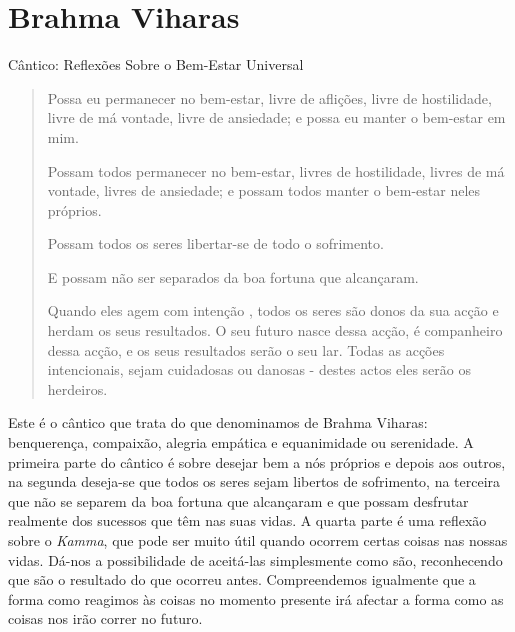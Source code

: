 \chapter{Brahma Viharas}

Cântico: Reflexões Sobre o Bem-Estar Universal

\begin{quote}
  Possa eu permanecer no bem-estar, livre de aflições, livre de hostilidade,
  livre de má vontade, livre de ansiedade; e possa eu manter o bem-estar em mim.

  Possam todos permanecer no bem-estar, livres de hostilidade, livres de má
  vontade, livres de ansiedade; e possam todos manter o bem-estar neles
  próprios.

  Possam todos os seres libertar-se de todo o sofrimento.

  E possam não ser separados da boa fortuna que alcançaram.

  Quando eles agem com intenção , todos os seres são donos da sua acção e herdam
  os seus resultados. O seu futuro nasce dessa acção, é companheiro dessa acção,
  e os seus resultados serão o seu lar. Todas as acções intencionais, sejam
  cuidadosas ou danosas - destes actos eles serão os herdeiros.
\end{quote}

Este é o cântico que trata do que denominamos de Brahma Viharas:
benquerença, compaixão, alegria empática e equanimidade ou serenidade. A
primeira parte do cântico é sobre desejar bem a nós próprios e depois
aos outros, na segunda deseja-se que todos os seres sejam libertos de
sofrimento, na terceira que não se separem da boa fortuna que alcançaram
e que possam desfrutar realmente dos sucessos que têm nas suas vidas. A
quarta parte é uma reflexão sobre o \emph{Kamma}, que pode ser muito
útil quando ocorrem certas coisas nas nossas vidas. Dá-nos a
possibilidade de aceitá-las simplesmente como são, reconhecendo que são
o resultado do que ocorreu antes. Compreendemos igualmente que a forma
como reagimos às coisas no momento presente irá afectar a forma como as
coisas nos irão correr no futuro.

